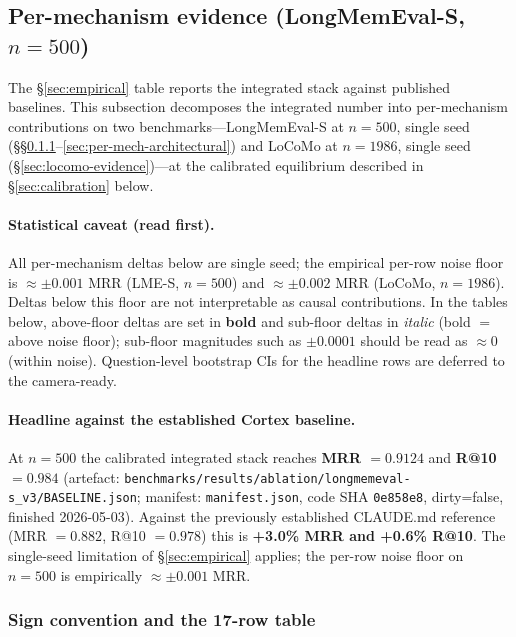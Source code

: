 \documentclass[11pt]{article}
\begin{document}
\subsection{Per-mechanism evidence (LongMemEval-S, $n{=}500$)}
\label{sec:per-mechanism}

The \S\ref{sec:empirical} table reports the integrated stack against
published baselines.  This subsection decomposes the integrated number
into per-mechanism contributions on two benchmarks---LongMemEval-S
at $n{=}500$, single seed (\S\S\ref{sec:per-mech-table}--\ref{sec:per-mech-architectural})
and LoCoMo at $n{=}1986$, single seed (\S\ref{sec:locomo-evidence})---at
the calibrated equilibrium described in \S\ref{sec:calibration} below.

\paragraph{Statistical caveat (read first).}  All per-mechanism
deltas below are single seed; the empirical per-row noise floor is
$\approx \pm 0.001$ MRR (LME-S, $n{=}500$) and $\approx \pm 0.002$
MRR (LoCoMo, $n{=}1986$).  Deltas below this floor are not
interpretable as causal contributions.  In the tables below,
above-floor deltas are set in \textbf{bold} and sub-floor deltas in
\emph{italic} (bold $=$ above noise floor); sub-floor magnitudes
such as $\pm0.0001$ should be read as $\approx 0$ (within noise).
Question-level bootstrap CIs for the headline rows are deferred to
the camera-ready.

\paragraph{Headline against the established Cortex baseline.}  At
$n{=}500$ the calibrated integrated stack reaches
\textbf{MRR $= 0.9124$} and \textbf{R@10 $= 0.984$}
(artefact: \texttt{benchmarks/results/ablation/longmemeval-s\_v3/BASELINE.json};
manifest: \texttt{manifest.json}, code SHA \texttt{0e858e8}, dirty=false,
finished 2026-05-03).  Against the previously established CLAUDE.md
reference (MRR $= 0.882$, R@10 $= 0.978$) this is \textbf{+3.0\% MRR
and +0.6\% R@10}.  The single-seed limitation of \S\ref{sec:empirical}
applies; the per-row noise floor on $n{=}500$ is empirically
$\approx \pm 0.001$ MRR.

\subsubsection{Sign convention and the 17-row table}
\label{sec:per-mech-table}
\end{document}
